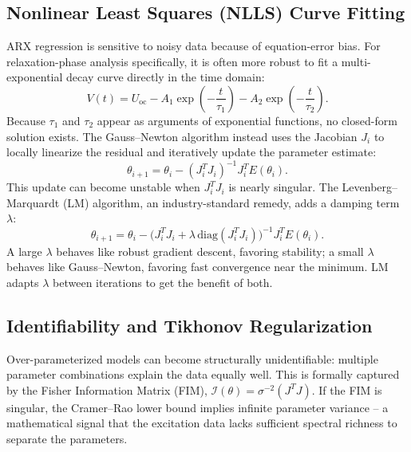\subsection{Nonlinear Least Squares (NLLS) Curve Fitting}
\label{subsec:nlls_curve_fitting}

ARX regression is sensitive to noisy data because of equation-error bias. For relaxation-phase analysis specifically, it is often more robust to fit a multi-exponential decay curve directly in the time domain:
\begin{equation}
\label{eq:nlls_relaxation}
V(t) = U_{\mathrm{oc}} - A_1 \exp\!\left(-\frac{t}{\tau_1}\right) - A_2 \exp\!\left(-\frac{t}{\tau_2}\right).
\end{equation}
Because $\tau_1$ and $\tau_2$ appear as arguments of exponential functions, no closed-form solution exists. The Gauss--Newton algorithm instead uses the Jacobian $J_i$ to locally linearize the residual and iteratively update the parameter estimate:
\begin{equation}
\label{eq:gauss_newton_update}
\theta_{i+1} = \theta_i - (J_i^T J_i)^{-1} J_i^T E(\theta_i).
\end{equation}
This update can become unstable when $J_i^T J_i$ is nearly singular. The Levenberg--Marquardt (LM) algorithm, an industry-standard remedy, adds a damping term $\lambda$:
\begin{equation}
\label{eq:lm_update}
\theta_{i+1} = \theta_i - \big(J_i^T J_i + \lambda\, \mathrm{diag}(J_i^T J_i)\big)^{-1} J_i^T E(\theta_i).
\end{equation}
A large $\lambda$ behaves like robust gradient descent, favoring stability; a small $\lambda$ behaves like Gauss--Newton, favoring fast convergence near the minimum. LM adapts $\lambda$ between iterations to get the benefit of both.

\subsection{Identifiability and Tikhonov Regularization}
\label{subsec:identifiability_sensitivity}

Over-parameterized models can become structurally unidentifiable: multiple parameter combinations explain the data equally well. This is formally captured by the Fisher Information Matrix (FIM), $\mathcal{I}(\theta) = \sigma^{-2} (J^T J)$. If the FIM is singular, the Cramer--Rao lower bound implies infinite parameter variance -- a mathematical signal that the excitation data lacks sufficient spectral richness to separate the parameters.

